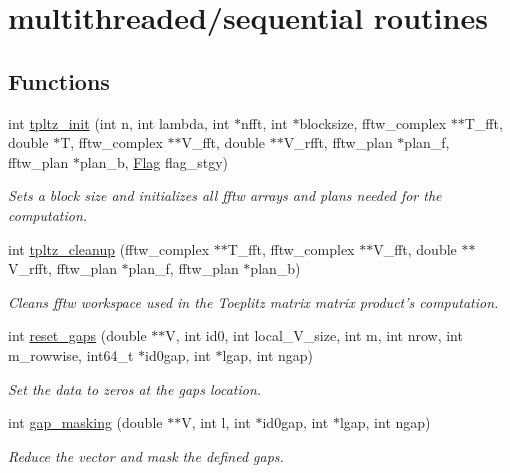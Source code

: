 \hypertarget{group__group11}{\section{multithreaded/sequential routines}
\label{group__group11}
}
\subsection*{Functions}
\begin{DoxyCompactItemize}
\item 
int \hyperlink{group__group11_ga7f4e77d71f2c6f2caf652bab7520e3f4}{tpltz\-\_\-init} (int n, int lambda, int $\ast$nfft, int $\ast$blocksize, fftw\-\_\-complex $\ast$$\ast$T\-\_\-fft, double $\ast$T, fftw\-\_\-complex $\ast$$\ast$V\-\_\-fft, double $\ast$$\ast$V\-\_\-rfft, fftw\-\_\-plan $\ast$plan\-\_\-f, fftw\-\_\-plan $\ast$plan\-\_\-b, \hyperlink{structFlag}{Flag} flag\-\_\-stgy)
\begin{DoxyCompactList}\small\item\em Sets a block size and initializes all fftw arrays and plans needed for the computation. \end{DoxyCompactList}\item 
int \hyperlink{group__group11_gac7ac0ee5f6eaee6846814b131671f6e8}{tpltz\-\_\-cleanup} (fftw\-\_\-complex $\ast$$\ast$T\-\_\-fft, fftw\-\_\-complex $\ast$$\ast$V\-\_\-fft, double $\ast$$\ast$V\-\_\-rfft, fftw\-\_\-plan $\ast$plan\-\_\-f, fftw\-\_\-plan $\ast$plan\-\_\-b)
\begin{DoxyCompactList}\small\item\em Cleans fftw workspace used in the Toeplitz matrix matrix product's computation. \end{DoxyCompactList}\item 
int \hyperlink{group__group11_ga639be254160aa6fdb502dfff6190950a}{reset\-\_\-gaps} (double $\ast$$\ast$V, int id0, int local\-\_\-\-V\-\_\-size, int m, int nrow, int m\-\_\-rowwise, int64\-\_\-t $\ast$id0gap, int $\ast$lgap, int ngap)
\begin{DoxyCompactList}\small\item\em Set the data to zeros at the gaps location. \end{DoxyCompactList}\item 
int \hyperlink{group__group11_ga8a16933581102fbad56d8ef6610eac81}{gap\-\_\-masking} (double $\ast$$\ast$V, int l, int $\ast$id0gap, int $\ast$lgap, int ngap)
\begin{DoxyCompactList}\small\item\em Reduce the vector and mask the defined gaps. \end{DoxyCompactList}\item 

\end{DoxyCompactItemize}
